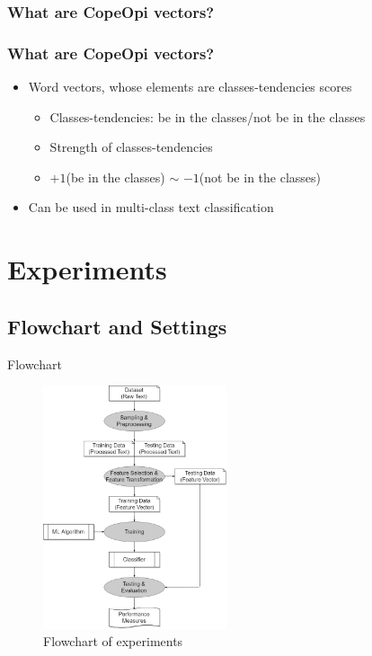 \documentclass[mathserif]{beamer}
\begin{document}
\subsubsection{What are CopeOpi vectors?}
\begin{frame}
\frametitle{What are CopeOpi vectors?}
\begin{itemize}
\item Word vectors, whose elements are classes-tendencies scores
	\begin{itemize}
	\item Classes-tendencies: be in the classes/not be in the classes
	\item Strength of classes-tendencies
	\item $+1$(be in the classes) $\sim$ $-1$(not be in the classes)
	\end{itemize}
\item Can be used in multi-class text classification
\end{itemize}
\end{frame}


\section{Experiments}
\subsection{Flowchart and Settings}
\begin{frame}{Flowchart}
	\begin{figure}
	\centering
	\caption{Flowchart of experiments}
	\includegraphics[width=0.48\textwidth]{./figure/flowchart.png}
	\end{figure}
\end{frame}
\end{document}
